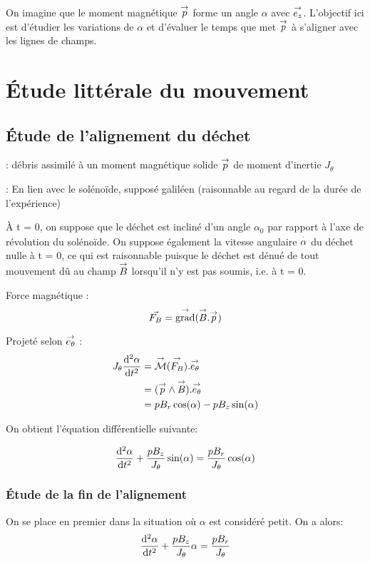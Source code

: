 \documentclass{report}
\begin{document}
On imagine que le moment magnétique $\overset{\to}{p}$ forme un angle $\alpha$ avec $\overset{\to}{e_z}$. L'objectif ici est d'étudier les variations de $\alpha$ et d'évaluer le temps que met $\overset{\to}{p}$ à s'aligner avec les lignes de champs.
\newpage
\section{Étude littérale du mouvement}
\subsection{Étude de l'alignement du déchet}

: {débris assimilé à un moment magnétique solide $\overset{\to}{p}$ de moment d'inertie $J_\theta$}

: En lien avec le solénoïde, supposé galiléen (raisonnable au regard de la durée de l'expérience)


À t = 0, on suppose que le déchet est incliné d'un angle $\alpha_0$ par rapport à l'axe de révolution du solénoïde. On suppose également la vitesse angulaire $\overset{\cdot}{\alpha}$ du déchet nulle à t = 0, ce qui est raisonnable puisque le déchet est dénué de tout mouvement dû au champ $\overset{\to}{B}$ lorsqu'il n'y est pas soumis, i.e. à t = 0.


Force magnétique :
$$\vec{F_B} = \overset{\to}{\text{grad}}(\overset{\to}{B}.\overset{\to}{p})$$


Projeté selon $\overset{\to}{e_\theta}$ :
\begin{align*}
J_\theta \frac{\mathrm{d^2}\alpha}{\mathrm{d}t^2} &= \overset{\to}{\mathcal{M}}(\overset{\to}{F_B}) . \overset{\to}{e_\theta} \\
&= (\overset{\to}{p} \wedge \overset{\to}{B}).\overset{\to}{e_\theta}\\
&= pB_r \cos(\alpha) - pB_z\sin(\alpha)
\end{align*}

On obtient l'équation différentielle suivante:
\begin{prettybox}[blue]
$$\frac{\mathrm{d^2}\alpha}{\mathrm{d}t^2} + \frac{pB_z}{J_\theta}\sin(\alpha) = \frac{pB_r}{J_\theta} \cos(\alpha)$$
\end{prettybox}
\subsubsection{Étude de la fin de l'alignement}
On se place en premier dans la situation où $\alpha$ est considéré petit. On a alors:
$$\frac{\mathrm{d^2}\alpha}{\mathrm{d}t^2} + \frac{pB_z}{J_\theta}\alpha = \frac{pB_r}{J_\theta} $$
\end{document}
